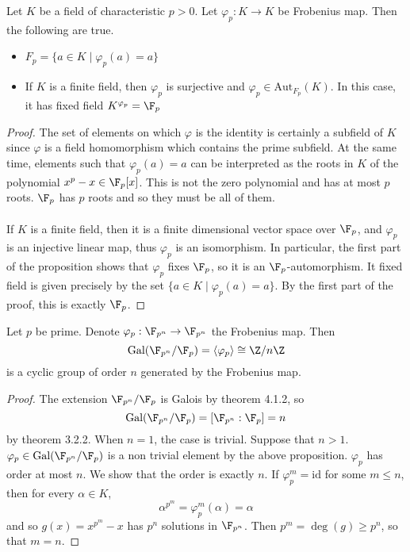 \documentclass[a4paper]{article}
\begin{document}
\begin{prp}{}{} Let $K$ be a field of characteristic $p>0$. Let $\varphi_p:K\to K$ be Frobenius map. Then the following are true. 
\begin{itemize}
\item $F_p=\{a\in K\;|\;\varphi_p(a)=a\}$
\item If $K$ is a finite field, then $\varphi_p$ is surjective and $\varphi_p\in\text{Aut}_{F_p}(K)$. In this case, it has fixed field $K^{\varphi_p}=\F_p$
\end{itemize} \tcbline
\begin{proof}
The set of elements on which $\varphi$ is the identity is certainly a subfield of $K$ since $\varphi$ is a field homomorphism which contains the prime subfield. At the same time, elements such that $\varphi_p(a)=a$ can be interpreted as the roots in $K$ of the polynomial $x^p-x\in\F_p[x]$. This is not the zero polynomial and has at most $p$ roots. $\F_p$ has $p$ roots and so they must be all of them. \\~\\

If $K$ is a finite field, then it is a finite dimensional vector space over $\F_p$, and $\varphi_p$ is an injective linear map, thus $\varphi_p$ is an isomorphism. In particular, the first part of the proposition shows that $\varphi_p$ fixes $\F_p$, so it is an $\F_p$-automorphism. It fixed field is given precisely by the set $\{a\in K\;|\;\varphi_p(a)=a\}$. By the first part of the proof, this is exactly $\F_p$. 
\end{proof}
\end{prp}

\begin{thm}{}{} Let $p$ be prime. Denote $\varphi_p:\F_{p^n}\to\F_{p^n}$ the Frobenius map. Then $$\text{Gal}(\F_{p^n}/\F_p)=\langle\varphi_p\rangle\cong\Z/n\Z$$ is a cyclic group of order $n$ generated by the Frobenius map. \tcbline
\begin{proof}
The extension $\F_{p^n}/\F_p$ is Galois by theorem 4.1.2, so $$\text{Gal}(\F_{p^n}/\F_p)=[\F_{p^n}:\F_p]=n$$ by theorem 3.2.2. When $n=1$, the case is trivial. Suppose that $n>1$. $\varphi_p\in\text{Gal}(\F_{p^n}/\F_p)$ is a non trivial element by the above proposition. $\varphi_p$ has order at most $n$. We show that the order is exactly $n$. If $\varphi_p^m=\text{id}$ for some $m\leq n$, then for every $\alpha\in K$, $$\alpha^{p^m}=\varphi_p^m(\alpha)=\alpha$$ and so $g(x)=x^{p^m}-x$ has $p^n$ solutions in $\F_{p^n}$. Then $p^m=\deg(g)\geq p^n$, so that $m=n$. 
\end{proof}
\end{thm}
\end{document}
